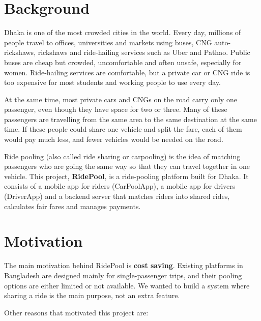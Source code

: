 
\section{Background}
\label{sec:background}

Dhaka is one of the most crowded cities in the world. Every day, millions of
people travel to offices, universities and markets using buses, CNG
auto-rickshaws, rickshaws and ride-hailing services such as Uber and Pathao.
Public buses are cheap but crowded, uncomfortable and often unsafe, especially
for women. Ride-hailing services are comfortable, but a private car or CNG ride
is too expensive for most students and working people to use every day.

At the same time, most private cars and CNGs on the road carry only one
passenger, even though they have space for two or three. Many of these
passengers are travelling from the same area to the same destination at the
same time. If these people could share one vehicle and split the fare, each of
them would pay much less, and fewer vehicles would be needed on the road.

Ride pooling (also called ride sharing or carpooling) is the idea of matching
passengers who are going the same way so that they can travel together in one
vehicle. This project, \textbf{RidePool}, is a ride-pooling platform built for
Dhaka. It consists of a mobile app for riders (CarPoolApp), a mobile app for
drivers (DriverApp) and a backend server that matches riders into shared rides,
calculates fair fares and manages payments.

\section{Motivation}
\label{sec:motivation}

The main motivation behind RidePool is \textbf{cost saving}. Existing platforms
in Bangladesh are designed mainly for single-passenger trips, and their pooling
options are either limited or not available. We wanted to build a system where
sharing a ride is the main purpose, not an extra feature.

Other reasons that motivated this project are:

